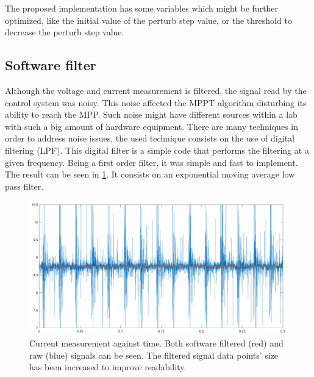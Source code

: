 The proposed implementation has some variables which might be further optimized, like the initial value of the perturb step value, or the threshold to decrease the perturb step value. 


\subsection{Software filter}
Although the voltage and current measurement is filtered, the signal read by the control system was noisy. This noise affected the MPPT algorithm disturbing its ability to reach the MPP. Such noise might have different sources within a lab with such a big amount of hardware equipment. There are many techniques in order to address noise issues, the used technique consists on the use of digital filtering (LPF). This digital filter is a  simple code that performs the filtering at a given frequency. Being a first order filter, it was simple and fast to implement. The result can be seen in \ref{software_filter}. It consists on an exponential moving average low pass filter.  

\begin{figure}[htbp]
	\begin{center}
		\includegraphics[width=\textwidth]{../Pictures/P1/Discussion/sw_filter_current.png}
		\caption{Current measurement against time. Both software filtered (red) and raw (blue) signals can be seen. The filtered signal data points' size has been increased to improve readability.}
		\label{software_filter}
	\end{center}	
\end{figure}









